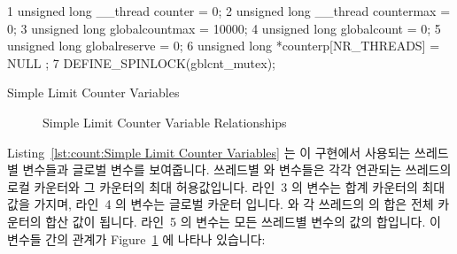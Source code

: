\begin{listing}[tbp]
{ \scriptsize
\begin{verbbox}
  1 unsigned long __thread counter = 0;
  2 unsigned long __thread countermax = 0;
  3 unsigned long globalcountmax = 10000;
  4 unsigned long globalcount = 0;
  5 unsigned long globalreserve = 0;
  6 unsigned long *counterp[NR_THREADS] = { NULL };
  7 DEFINE_SPINLOCK(gblcnt_mutex);
\end{verbbox}
}
\centering
\theverbbox
\caption{Simple Limit Counter Variables}
\label{lst:count:Simple Limit Counter Variables}
\end{listing}

\begin{figure}[tb]
\centering
{}
\caption{Simple Limit Counter Variable Relationships}
\label{fig:count:Simple Limit Counter Variable Relationships}
\end{figure}

Listing~\ref{lst:count:Simple Limit Counter Variables} 는 이 구현에서 사용되는
쓰레드별 변수들과 글로벌 변수를 보여줍니다.
쓰레드별  와  변수들은 각각 연관되는 쓰레드의 로컬
카운터와 그 카운터의 최대 허용값입니다.
라인~3 의  변수는 합계 카운터의 최대값을 가지며, 라인~4 의
 변수는 글로벌 카운터 입니다.
 와 각 쓰레드의  의 합은 전체 카운터의 합산 값이
됩니다.
라인~5 의  변수는 모든 쓰레드별  변수의 값의
합입니다.
이 변수들 간의 관계가
Figure~\ref{fig:count:Simple Limit Counter Variable Relationships} 에 나타나
있습니다:
\iffalse

